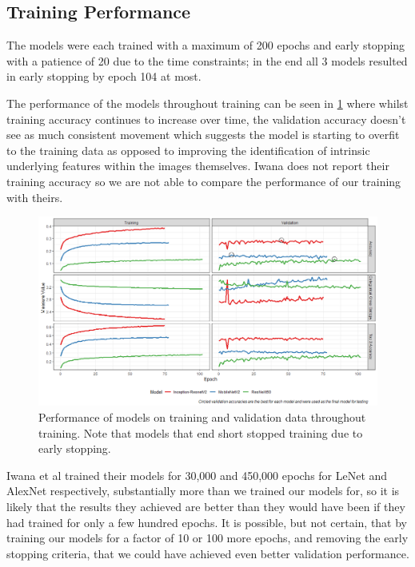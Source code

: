 \documentclass[12pt]{article}
\numberwithin{equation}{section}
\numberwithin{figure}{section}
\begin{document}
\subsection{Training Performance} 
\label{sub:Training_Performance} 
The models were each trained with a maximum of 200 epochs and early stopping with a patience of 20 due to the time constraints; in the end all 3 models resulted in early stopping by epoch 104 at most. 

The performance of the models throughout training can be seen in \cref{fig:train_perf} where whilst training accuracy continues to increase over time, the validation accuracy doesn't see as much consistent movement which suggests the model is starting to overfit to the training data as opposed to improving the identification of intrinsic underlying features within the images themselves. Iwana does not report their training accuracy so we are not able to compare the performance of our training with theirs.

\begin{figure}
	\centering
	\captionsetup{justification=centering}
	\includegraphics[scale=0.5]{training_results.png}
	\caption{Performance of models on training and validation data throughout training. Note that models that end short stopped training due to early stopping.}
	\label{fig:train_perf}
\end{figure}

Iwana et al trained their models for 30,000 and 450,000 epochs for LeNet and AlexNet respectively, substantially more than we trained our models for, so it is likely that the results they achieved are better than they would have been if they had trained for only a few hundred epochs. It is possible, but not certain, that by training our models for a factor of 10 or 100 more epochs, and removing the early stopping criteria, that we could have achieved even better validation performance. 
\end{document}
